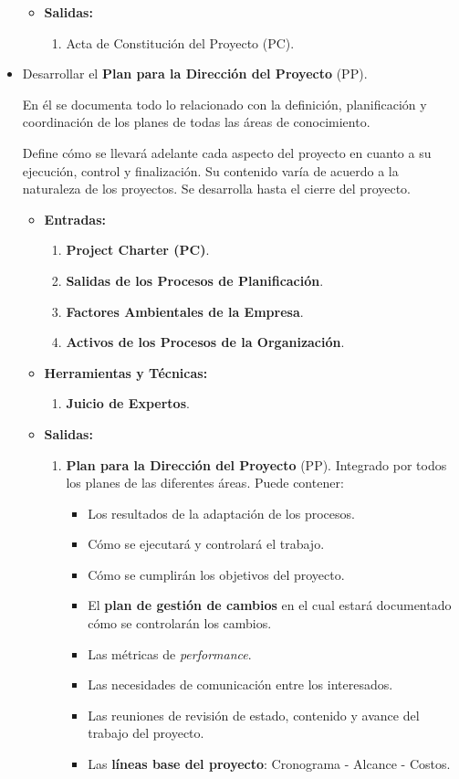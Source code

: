 \documentclass[10pt,a4paper]{article}
\begin{document}
\begin{itemize}
\begin{itemize}
\item \textbf{Salidas:}
\begin{enumerate}
\item Acta de Constitución del Proyecto (PC).
\end{enumerate}
\end{itemize}

\item Desarrollar el \textbf{Plan para la Dirección del Proyecto} (PP).

En él se documenta todo lo relacionado con la definición, planificación y coordinación de los planes de todas las áreas de conocimiento.

Define cómo se llevará adelante cada aspecto del proyecto en cuanto a su ejecución, control y finalización. Su contenido varía de acuerdo a la naturaleza de los proyectos. Se desarrolla hasta el cierre del proyecto.

\begin{itemize}
\item \textbf{Entradas:}
\begin{enumerate}
\item \textbf{Project Charter (PC)}.
\item \textbf{Salidas de los Procesos de Planificación}.
\item \textbf{Factores Ambientales de la Empresa}.
\item \textbf{Activos de los Procesos de la Organización}.
\end{enumerate}

\item \textbf{Herramientas y Técnicas:}
\begin{enumerate}
\item \textbf{Juicio de Expertos}.
\end{enumerate}

\item \textbf{Salidas:}
\begin{enumerate}
\item \textbf{Plan para la Dirección del Proyecto} (PP). Integrado por todos los planes de las diferentes áreas. Puede contener:
\begin{itemize}
\item Los resultados de la adaptación de los procesos.
\item Cómo se ejecutará y controlará el trabajo.
\item Cómo se cumplirán los objetivos del proyecto.
\item El \textbf{plan de gestión de cambios} en el cual estará documentado cómo se controlarán los cambios.
\item Las métricas de \textit{performance}.
\item Las necesidades de comunicación entre los interesados.
\item Las reuniones de revisión de estado, contenido y avance del trabajo del proyecto.
\item Las \textbf{líneas base del proyecto}: Cronograma - Alcance - Costos.
\end{itemize}
\end{enumerate}
\end{itemize}


\end{itemize}
\end{document}
